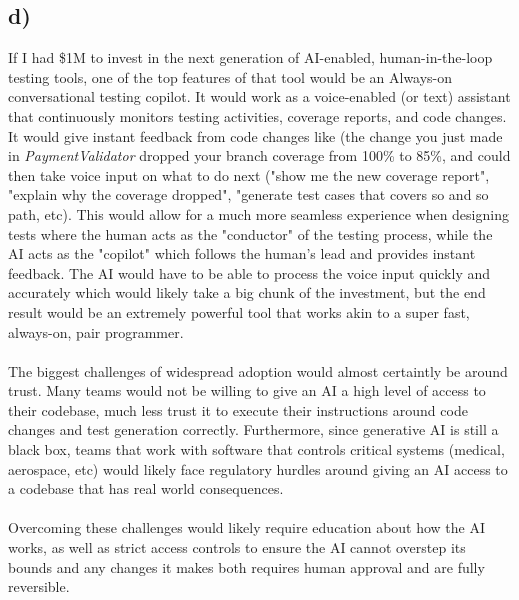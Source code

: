 \subsection{d)}

If I had \$1M to invest in the next generation of AI-enabled, human-in-the-loop testing tools, one of the top features of that tool would be an Always-on conversational testing copilot. It would work as a voice-enabled (or text) assistant that continuously monitors testing activities, coverage reports, and code changes. It would give instant feedback from code changes like (the change you just made in \emph{PaymentValidator} dropped your branch coverage from 100\% to 85\%, and could then take voice input on what to do next ("show me the new coverage report", "explain why the coverage dropped", "generate test cases that covers so and so path, etc). This would allow for a much more seamless experience when designing tests where the human acts as the "conductor" of the testing process, while the AI acts as the "copilot" which follows the human's lead and provides instant feedback. The AI would have to be able to process the voice input quickly and accurately which would likely take a big chunk of the investment, but the end result would be an extremely powerful tool that works akin to a super fast, always-on, pair programmer. 
\\
\\
The biggest challenges of widespread adoption would almost certaintly be around trust. Many teams would not be willing to give an AI a high level of access to their codebase, much less trust it to execute their instructions around code changes and test generation correctly. Furthermore, since generative AI is still a black box, teams that work with software that controls critical systems (medical, aerospace, etc) would likely face regulatory hurdles around giving an AI access to a codebase that has real world consequences.
\\
\\
Overcoming these challenges would likely require education about how the AI works, as well as strict access controls to ensure the AI cannot overstep its bounds and any changes it makes both requires human approval and are fully reversible.
